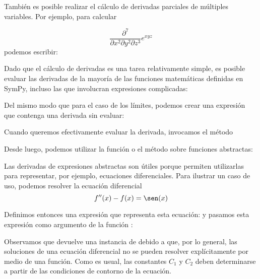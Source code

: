 
También es posible realizar el cálculo de derivadas parciales de múltiples variables. Por ejemplo, para calcular

\[ \frac{\partial^7}{\partial x^2 \partial y^2 \partial z^3} e^{x y z} \]
\noindent podemos escribir:


Dado que el cálculo de derivadas es una tarea relativamente simple, es posible evaluar las derivadas de la mayoría de las funciones matemáticas definidas en SymPy, incluso las que involucran expresiones complicadas:


Del mismo modo que para el caso de los límites, podemos crear una expresión que contenga una derivada sin evaluar:


Cuando queremos efectivamente evaluar la derivada, invocamos el método 


Desde luego, podemos utilizar la función o el método  sobre funciones abstractas:


Las derivadas de expresiones abstractas son útiles porque permiten utilizarlas para representar, por ejemplo, ecuaciones diferenciales. Para ilustrar un caso de uso, podemos resolver la ecuación diferencial 
\[ f''(x) - f(x) = \sen(x) \]

Definimos entonces una expresión que representa esta ecuación:
\noindent y pasamos esta expresión como argumento de la función :

Observamos que  devuelve una instancia de  debido a que, por lo general, las soluciones de una ecuación diferencial no se pueden resolver explícitamente por medio de una función. Como es usual, las constantes $C_1$ y $C_2$ deben determinarse a partir de las condiciones de contorno de la ecuación.

